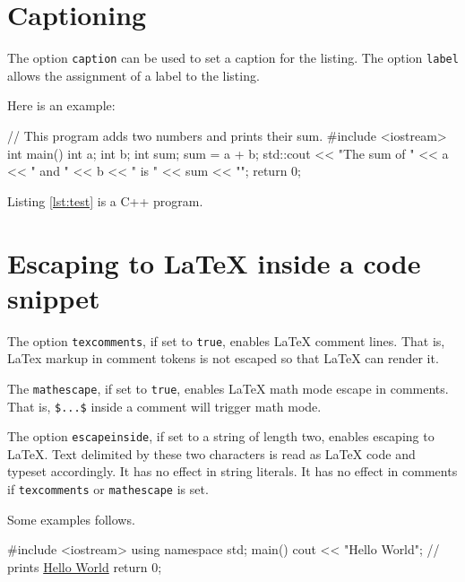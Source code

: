 \documentclass[10pt,a4paper]{article}
\begin{document}
\section{Captioning}

The option \verb|caption| can be used to set a caption for the listing.
The option \verb|label| allows the assignment of a label to the listing.

Here is an example:

\begin{Example}
\begin{pygmented}[lang=c++,label=lst:test,caption=A \textbf{C++} example]
// This program adds two numbers and prints their sum.
#include <iostream>
int main()
{
  int a;
  int b;
  int sum;
  sum = a + b;
  std::cout << "The sum of " << a << " and " << b
            << " is " << sum << "\n";
  return 0;
}
\end{pygmented}
\end{Example}

\begin{Example}
  Listing \ref{lst:test} is a C++ program.
\end{Example}

\section{Escaping to \LaTeX{} inside a code snippet}

The option \verb|texcomments|, if set to \texttt{true}, enables \LaTeX{}
comment lines. That is, LaTex markup in comment tokens is not escaped
so that \LaTeX{} can render it.

The \verb|mathescape|, if set to \texttt{true}, enables \LaTeX{} math
mode escape in comments. That is, \verb|$...$| inside a comment will
trigger math mode.

The option \verb|escapeinside|, if set to a string of length two,
enables escaping to \LaTeX{}. Text delimited by these two characters
is read as \LaTeX{} code and typeset accordingly. It has no effect in
string literals. It has no effect in comments if \verb|texcomments| or
\verb|mathescape| is set.

Some examples follows.

\begin{Example}
\begin{pygmented}[lang=c++,texcomments]
#include <iostream>
using namespace std;
main()
{
   cout << "Hello World";  // prints \underline{Hello World}
   return 0;
}
\end{pygmented}
\end{Example}
\end{document}
